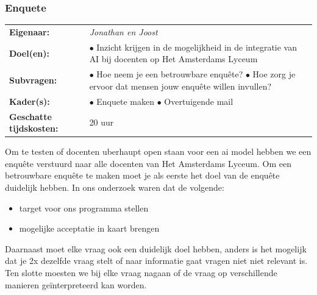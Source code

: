 \documentclass[12pt]{article}
\begin{document}
\subsubsection{Enquete}
\begin{tabularx}{\linewidth}{ll}
    \textbf{Eigenaar: } & \textit{Jonathan en Joost} \\
    \textbf{Doel(en): } & 
        \makecell[tl]{
            $\bullet$ Inzicht krijgen in de mogelijkheid in de integratie van AI \\ bij docenten op Het Amsterdams Lyceum \\
        } \\
    \textbf{Subvragen: } & 
        \makecell[tl]{
            $\bullet$ Hoe neem je een betrouwbare enquête? \\
            $\bullet$ Hoe zorg je ervoor dat mensen jouw enquête willen invullen? \\
        }\\
    \textbf{Kader(s): } & 
        \makecell[tl]{
            $\bullet$ Enquete maken\\
            $\bullet$ Overtuigende mail\\
        }\\
    \parbox[t]{3cm}{\raggedright\textbf{Geschatte  tijdskosten:} } & 20 uur \\
\end{tabularx}
\begin{multicols}{2}
Om te testen of docenten uberhaupt open staan voor een ai model hebben we een enquête verstuurd naar alle docenten van Het Amsterdams Lyceum. 
Om een betrouwbare enquête te maken moet je als eerste het doel van de enquête duidelijk hebben. In ons onderzoek waren dat de volgende:
\begin{minipage}{\linewidth}
\begin{itemize}
    \item target voor ons programma stellen
    \item mogelijke acceptatie in kaart brengen
\end{itemize}
\end{minipage}
Daarnaast moet elke vraag ook een duidelijk doel hebben, anders is het mogelijk dat je 2x dezelfde vraag stelt of naar informatie gaat vragen niet niet relevant is.\\
Ten slotte moesten we bij elke vraag nagaan of de vraag op verschillende manieren geïnterpreteerd kan worden.\\
\end{multicols}%
\end{document}
